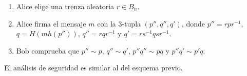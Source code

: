 \documentclass[12pt]{article}
\theoremstyle{definition}
\begin{document}
\begin{enumerate}
\item Alice elige una trenza aleatoria $r\in B_n$.
\item Alice firma el mensaje $m$ con la 3-tupla $(p'',q'',q')$, donde $p''=rpr^{-1}$, $q=H(mh(p''))$, $q''=rqr^{-1}$ y $q'=rs^{-1}qsr^{-1}$.
\item Bob comprueba que $p''\sim p$, $q''\sim q'$, $p''q''\sim pq$ y $p''q'\sim p'q$.
\end{enumerate}

El análisis de seguridad es similar al del esquema previo.













		
\end{document}
